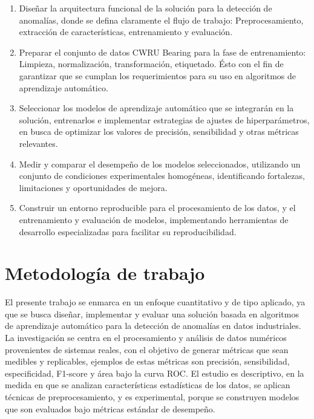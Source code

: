 \documentclass[11pt,a4paper,spanish]{book}
\numberwithin{equation}{chapter}
\numberwithin{figure}{chapter}
\begin{document}
\begin{enumerate}

\item Diseñar la arquitectura funcional de la solución para la detección de anomalías, 
donde se defina claramente el flujo de trabajo: Preprocesamiento, 
extracción de características, entrenamiento y evaluación.


\item Preparar el conjunto de datos CWRU Bearing para la fase de entrenamiento: 
Limpieza, normalización, transformación, etiquetado. Ésto con el fin de garantizar que 
se cumplan los requerimientos para su uso en algoritmos de aprendizaje automático.  


\item Seleccionar los modelos de aprendizaje automático que se integrarán en la 
solución, entrenarlos e implementar estrategias de ajustes de hiperparámetros, 
en busca de optimizar los valores de precisión, sensibilidad y otras métricas 
relevantes.


\item Medir y comparar el desempeño de los modelos seleccionados, utilizando un 
conjunto de condiciones experimentales homogéneas, identificando fortalezas, 
limitaciones y oportunidades de mejora.


\item Construir un entorno reproducible para el procesamiento de los datos, 
y el entrenamiento y evaluación de modelos, implementando herramientas de desarrollo 
especializadas para facilitar su reproducibilidad.

\end{enumerate}


\chapter{Metodología de trabajo}


El presente trabajo se enmarca en un enfoque cuantitativo y de tipo aplicado, ya que se 
busca diseñar, implementar y evaluar una solución basada en algoritmos de aprendizaje 
automático para la detección de anomalías en datos industriales. La investigación se 
centra en el procesamiento y análisis de datos numéricos provenientes de sistemas reales,
con el objetivo de generar métricas que sean medibles y replicables, ejemplos de estas 
métricas son precisión, sensibilidad, especificidad, F1-score y área bajo la curva ROC.
El estudio es descriptivo, en la medida en que se analizan características estadísticas 
de los datos, se aplican técnicas de preprocesamiento, y es experimental, porque se 
construyen modelos que son evaluados bajo métricas estándar de desempeño. 
\end{document}
